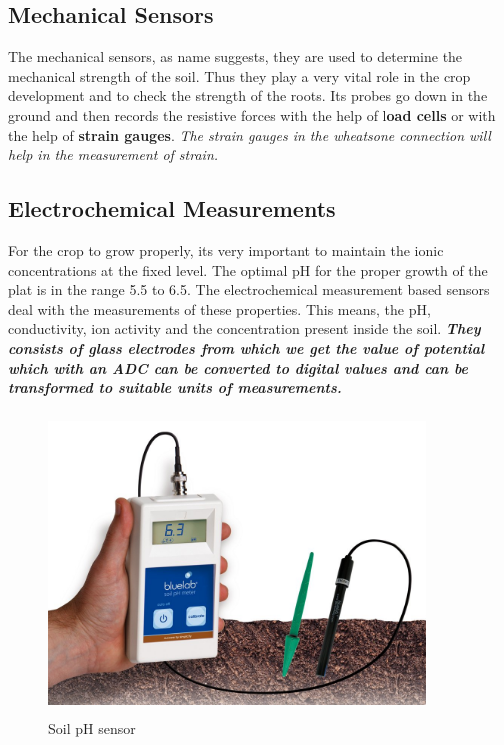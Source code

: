 \documentclass[11pt]{article}
\begin{document}
\subsection{Mechanical Sensors}
The mechanical sensors, as name suggests, they are used to determine the mechanical strength of the soil. Thus they play a very vital role in the crop development and to check the strength of the roots. Its probes go down in the ground and then records the resistive forces with the help of l\textbf{oad cells} or with the help of \textbf{strain gauges}. \textit{The strain gauges in the wheatsone connection will help in the measurement of strain.}
\subsection{Electrochemical Measurements}
For the crop to grow properly, its very important to maintain the ionic concentrations at the fixed level. The optimal pH for the proper growth of the plat is in the range 5.5 to 6.5. The electrochemical measurement based sensors deal with the measurements of these properties. This means, the pH, conductivity, ion activity and the concentration present inside the soil.\textit{\textbf{ They consists of glass electrodes from which we get the value of potential which with an ADC can be converted to digital values and can be transformed to suitable units of measurements. }}


\begin{figure}[!h]
  \centering
    \vspace*{0 cm}
  \includegraphics[height=80mm,width=100mm]{pp.jpg}
    \caption{Soil pH sensor}
  \label{fig:Soil Moisture Sensor}
\end{figure}
\end{document}
